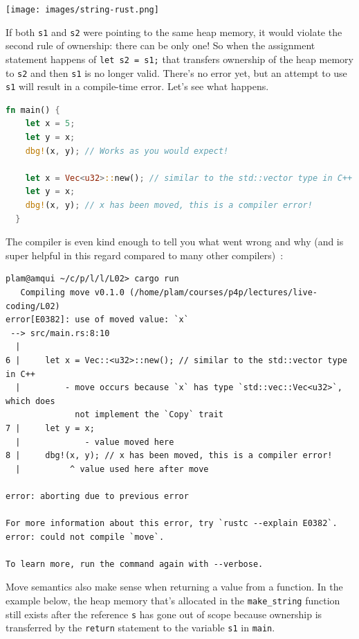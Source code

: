 \documentclass[a4paper]{report}
\begin{document}
\begin{center}
\texttt{[image: images/string-rust.png]}
\end{center}

If both \texttt{s1} and \texttt{s2} were pointing to the same heap memory, it would violate the second rule of ownership: there can be only one! So when the assignment statement happens of \texttt{let s2 = s1;} that transfers ownership of the heap memory to \texttt{s2} and then \texttt{s1} is no longer valid. There's no error yet, but an attempt to use \texttt{s1} will result in a compile-time error. Let's see what happens.

\begin{lstlisting}[language=Rust]
  fn main() {
    let x = 5;
    let y = x;
    dbg!(x, y); // Works as you would expect!

    let x = Vec<u32>::new(); // similar to the std::vector type in C++
    let y = x;
    dbg!(x, y); // x has been moved, this is a compiler error!
  }
\end{lstlisting}

The compiler is even kind enough to tell you what went wrong and why (and is super helpful in this regard compared to many other compilers)~\cite{rustdocs}:
\begin{verbatim}
plam@amqui ~/c/p/l/l/L02> cargo run
   Compiling move v0.1.0 (/home/plam/courses/p4p/lectures/live-coding/L02)
error[E0382]: use of moved value: `x`
 --> src/main.rs:8:10
  |
6 |     let x = Vec::<u32>::new(); // similar to the std::vector type in C++
  |         - move occurs because `x` has type `std::vec::Vec<u32>`, which does 
              not implement the `Copy` trait
7 |     let y = x;
  |             - value moved here
8 |     dbg!(x, y); // x has been moved, this is a compiler error!
  |          ^ value used here after move

error: aborting due to previous error

For more information about this error, try `rustc --explain E0382`.
error: could not compile `move`.

To learn more, run the command again with --verbose.
\end{verbatim}

Move semantics also make sense when returning a value from a function. In the example below, the heap memory that's allocated in the \texttt{make\_string} function still exists after the reference \texttt{s} has gone out of scope because ownership is transferred by the \texttt{return} statement to the variable \texttt{s1} in \texttt{main}.
\end{document}
